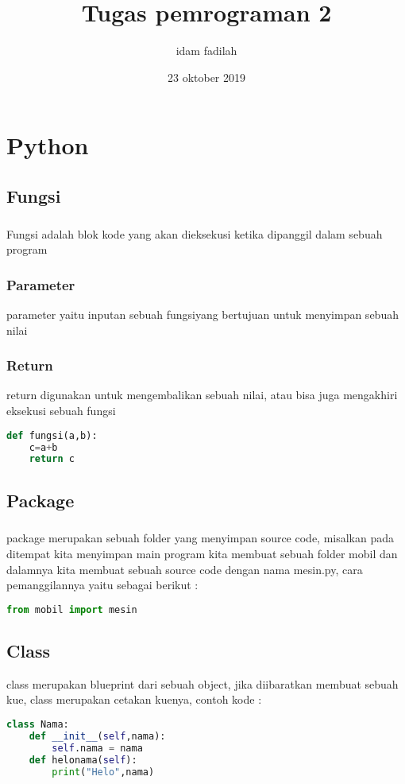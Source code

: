 \documentclass[a4paper,12pt]{report}
\title{Tugas pemrograman 2}
\author{idam fadilah}
\date{23 oktober 2019}
\begin{document}
\maketitle
\chapter{Python}
\section{Fungsi}
\paragraph{}
Fungsi adalah blok kode yang akan dieksekusi ketika dipanggil dalam sebuah program
\subsection*{Parameter}
parameter yaitu inputan sebuah fungsiyang bertujuan untuk menyimpan sebuah nilai
\subsection*{Return}
return digunakan untuk mengembalikan sebuah nilai, atau bisa juga mengakhiri eksekusi sebuah fungsi
\begin{lstlisting}[language=Python]
def fungsi(a,b):
	c=a+b
	return c
\end{lstlisting}
\section{Package}
\paragraph{}
package merupakan sebuah folder yang menyimpan source code, misalkan pada ditempat kita menyimpan main program kita membuat sebuah folder mobil dan dalamnya kita membuat sebuah source code dengan nama mesin.py, cara pemanggilannya yaitu sebagai berikut :
\begin{lstlisting}[language=Python]
from mobil import mesin
\end{lstlisting}
\section{Class}
class merupakan blueprint dari sebuah object, jika diibaratkan membuat sebuah kue, class merupakan cetakan kuenya, contoh kode :
\begin{lstlisting}[language=Python]
class Nama:
    def __init__(self,nama):
        self.nama = nama
    def helonama(self):
        print("Helo",nama)
\end{lstlisting}
\end{document}
